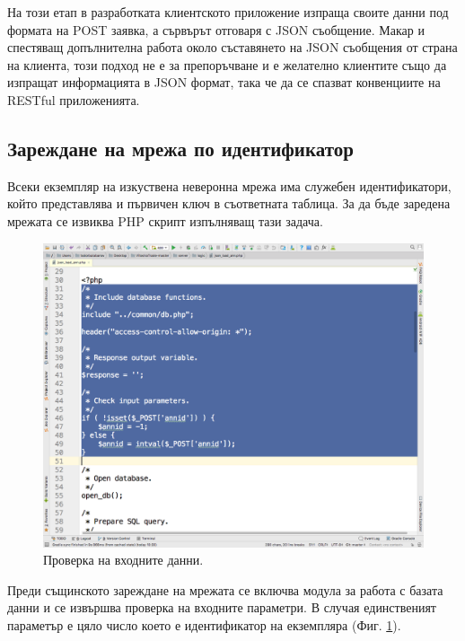 \documentclass[book,14pt,oneside,openany]{memoir}
\begin{document}
На този етап в разработката клиентското приложение изпраща своите данни под формата на POST заявка, а сървърът отговаря с JSON съобщение. Макар и спестяващ допълнителна работа около съставянето на JSON съобщения от страна на клиента, този подход не е за препоръчване и е желателно клиентите също да изпращат информацията в JSON формат, така че да се спазват конвенциите на RESTful приложенията. 

\subsection{Зареждане на мрежа по идентификатор}

Всеки екземпляр на изкуствена неверонна мрежа има служебен идентификатори, който представлява и първичен ключ в съответната таблица. За да бъде заредена мрежата се извиква PHP скрипт изпълняващ тази задача. 

\begin{figure}[h]
  \centering
  \includegraphics[height=0.45\pdfpageheight]{pic0115}
  \caption{Проверка на входните данни.}
\label{fig:pic0115}
\end{figure}
\FloatBarrier

Преди същинското зареждане на мрежата се включва модула за работа с базата данни и се извършва проверка на входните параметри. В случая единственият параметър е цяло число което е идентификатор на екземпляра (Фиг. \ref{fig:pic0115}).
\end{document}
